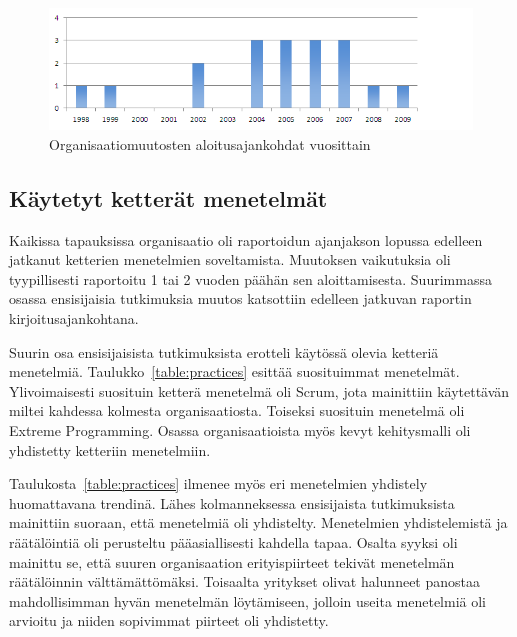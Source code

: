 \begin{figure}[htb]
  \begin{center}
    \includegraphics[width=1\textwidth]{img/Transformation_start}
    \caption{Organisaatiomuutosten aloitusajankohdat vuosittain}
    \label{fig:start_year}
  \end{center}
\end{figure}

\subsection{Käytetyt ketterät menetelmät}

Kaikissa tapauksissa organisaatio oli raportoidun ajanjakson lopussa edelleen
jatkanut ketterien menetelmien soveltamista. Muutoksen vaikutuksia oli
tyypillisesti raportoitu 1 tai 2 vuoden päähän sen aloittamisesta. Suurimmassa
osassa ensisijaisia tutkimuksia muutos katsottiin edelleen jatkuvan raportin
kirjoitusajankohtana.

Suurin osa ensisijaisista tutkimuksista erotteli käytössä olevia ketteriä
menetelmiä. Taulukko~\ref{table:practices} esittää suosituimmat menetelmät.
Ylivoimaisesti suosituin ketterä menetelmä oli Scrum, jota mainittiin
käytettävän miltei kahdessa kolmesta organisaatiosta. Toiseksi suosituin
menetelmä oli Extreme Programming. Osassa organisaatioista myös kevyt
kehitysmalli oli yhdistetty ketteriin menetelmiin.

Taulukosta~\ref{table:practices} ilmenee myös eri menetelmien yhdistely
huomattavana trendinä. Lähes kolmanneksessa ensisijaista tutkimuksista
mainittiin suoraan, että menetelmiä oli yhdistelty. Menetelmien yhdistelemistä
ja räätälöintiä oli perusteltu pääasiallisesti kahdella tapaa. Osalta syyksi oli
mainittu se, että suuren organisaation erityispiirteet tekivät menetelmän
räätälöinnin välttämättömäksi. Toisaalta yritykset olivat halunneet panostaa
mahdollisimman hyvän menetelmän löytämiseen, jolloin useita menetelmiä oli
arvioitu ja niiden sopivimmat piirteet oli yhdistetty.

